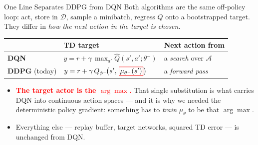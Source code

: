 \begin{frame}{One Line Separates DDPG from DQN}
\vspace{0.6em}
Both algorithms are the same off-policy loop: act, store in $\mathcal{D}$, sample a minibatch, regress $Q$ onto a bootstrapped target. They differ in \emph{how the next action in the target is chosen}.
\vspace{0.8em}
\begin{center}
\renewcommand{\arraystretch}{2.1}
\begin{tabular}{p{} p{} p{}}
\hline
 & \textbf{TD target} & \textbf{Next action from} \\
\hline
\textbf{DQN} & $y = r + \gamma\, \displaystyle\max_{a'} \hat{Q}(s',a';\theta^{-})$ & a \emph{search} over $\mathcal{A}$ \\
\textbf{DDPG} (today) & $y = r + \gamma\, Q_{\phi^{-}}\!\big(s',\, \rbox{\mu_{\theta^{-}}(s')}\big)$ & a \emph{forward pass} \\
\hline
\end{tabular}
\end{center}
\vspace{0.8em}
\begin{itemize}
    \item \textcolor{red}{\textbf{The target actor is the $\arg\max$.}} That single substitution is what carries DQN into continuous action spaces --- and it is why we needed the deterministic policy gradient: something has to \emph{train} $\mu_\theta$ to be that $\arg\max$.
    \item Everything else --- replay buffer, target networks, squared TD error --- is unchanged from DQN.
\end{itemize}
\end{frame}
